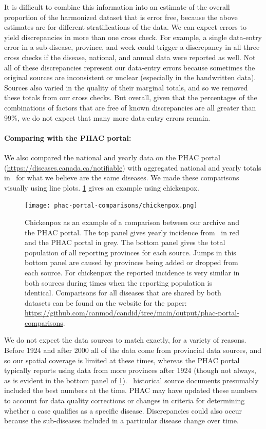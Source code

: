 \documentclass[12pt]{article}
\begin{document}
It is difficult to combine this information into an estimate of the overall proportion of the harmonized dataset that is error free, because the above estimates are for different stratifications of the data. We can expect errors to yield discrepancies in more than one cross check. For example, a single data-entry error in a sub-disease, province, and week could trigger a discrepancy in all three cross checks if the disease, national, and annual data were reported as well. Not all of these discrepancies represent our data-entry errors because sometimes the original sources are inconsistent or unclear (especially in the handwritten data). Sources also varied in the quality of their marginal totals, and so we removed these totals from our cross checks. But overall, given that the percentages of the combinations of factors that are free of known discrepancies are all greater than 99\%, we do not expect that many more data-entry errors remain.

\paragraph{Comparing with the PHAC portal:} We also compared the national and yearly data on the PHAC portal (\url{https://diseases.canada.ca/notifiable}) with aggregated national and yearly totals in \datacronym\ for what we believe are the same diseases. We made these comparisons visually using line plots. \cref{fig:appendix-chickenpox} gives an example using chickenpox.

\begin{figure}
  \texttt{[image: phac-portal-comparisons/chickenpox.png]}
  \caption{Chickenpox as an example of a comparison between our archive and the PHAC portal. The top panel gives yearly incidence from \datacronym\ in red and the PHAC portal in grey. The bottom panel gives the total population of all reporting provinces for each source. Jumps in this bottom panel are caused by provinces being added or dropped from each source. For chickenpox the reported incidence is very similar in both sources during times when the reporting population is identical. Comparisons for all diseases that are shared by both datasets can be found on the website for the paper: \url{https://github.com/canmod/candid/tree/main/output/phac-portal-comparisons}.}\label{fig:appendix-chickenpox}
\end{figure}

We do not expect the data sources to match exactly, for a variety of reasons. Before 1924 and after 2000 all of the data come from provincial data sources, and so our spatial coverage is limited at these times, whereas the PHAC portal typically reports using data from more provinces after 1924 (though not always, as is evident in the bottom panel of \cref{fig:appendix-chickenpox}). \datacronym\ historical source documents presumably included the best numbers at the time. PHAC may have updated these numbers to account for data quality corrections or changes in criteria for determining whether a case qualifies as a specific disease. Discrepancies could also occur because the sub-diseases included in a particular disease change over time.
\end{document}
